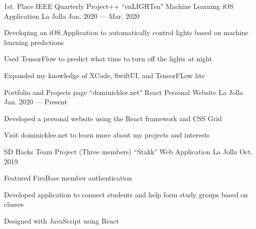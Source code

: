 

\begin{cventries}

  \cventry
    {1st. Place IEEE Quarterly Project++} %
    {``enLIGHTen" Machine Learning iOS Application} %
    {La Jolla} %
    {Jan. 2020 — Mar. 2020} %
    {
      \begin{cvitems} %
        \item {Developing an iOS Application to automatically control lights based on machine learning predictions}
        \item {Used TensorFlow to predict what time to turn off the lights at night}
        \item {Expanded my knowledge of XCode, SwiftUI, and TensorFLow lite}
      \end{cvitems}
    }

  \cventry
    {Portfolio and Projects page} %
    {``dominicklee.net" React Personal Website} %
    {La Jolla} %
    {Jan. 2020 — Present} %
    {
      \begin{cvitems} %
        \item {Developed a personal website using the React framework and CSS Grid}
        \item {Visit dominicklee.net to learn more about my projects and interests}
      \end{cvitems}
    }

  \cventry
    {SD Hacks Team Project (Three members)} %
    {``Stakk" Web Application} %
    {La Jolla} %
    {Oct. 2019} %
    {
      \begin{cvitems} %
        \item {Featured FireBase member authentication}
        \item {Developed application to connect students and help form study groups based on classes}
        \item {Designed with JavaScript using React}
      \end{cvitems}
    }


\end{cventries}
